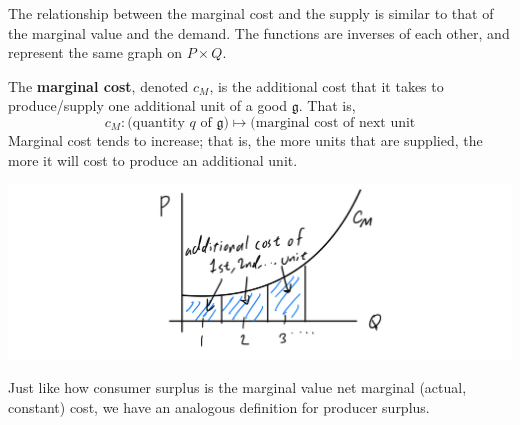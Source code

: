 \documentclass{article}
\begin{document}
    The relationship between the marginal cost and the supply is similar to that of the marginal value and the demand. The functions are inverses of each other, and represent the same graph on $P \times Q$. 

    \begin{definition}
      The \textbf{marginal cost}, denoted $c_M$, is the additional cost that it takes to produce/supply one additional unit of a good $\mathfrak{g}$. That is, 
      \[c_M: \big( \text{quantity } q \text{ of } \mathfrak{g} \big) \mapsto \big( \text{marginal cost of next unit}\]
      Marginal cost tends to increase; that is, the more units that are supplied, the more it will cost to produce an additional unit. 
      \begin{center}
          \includegraphics[scale=0.27]{img/Marginal_Cost_Curve.PNG}
      \end{center}
    \end{definition}

    Just like how consumer surplus is the marginal value net marginal (actual, constant) cost, we have an analogous definition for producer surplus. 
\end{document}

